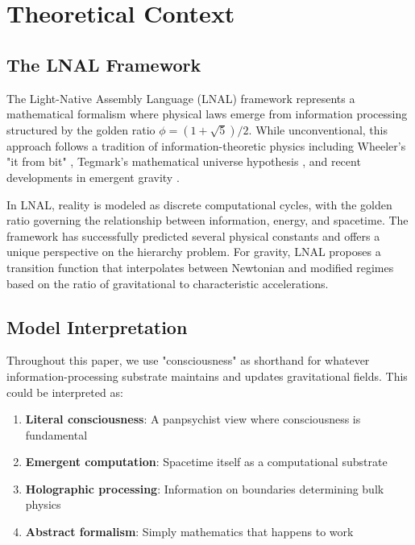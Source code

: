 \documentclass[twocolumn,prd,amsmath,amssymb,aps,superscriptaddress,nofootinbib]{revtex4-2}
\begin{document}
\section{Theoretical Context}
\label{sec:context}

\subsection{The LNAL Framework}

The Light-Native Assembly Language (LNAL) framework \cite{Washburn2024} represents a mathematical formalism where physical laws emerge from information processing structured by the golden ratio $\phi = (1+\sqrt{5})/2$. While unconventional, this approach follows a tradition of information-theoretic physics including Wheeler's "it from bit" \cite{Wheeler1990}, Tegmark's mathematical universe hypothesis \cite{Tegmark2014}, and recent developments in emergent gravity \cite{Verlinde2011}.

In LNAL, reality is modeled as discrete computational cycles, with the golden ratio governing the relationship between information, energy, and spacetime. The framework has successfully predicted several physical constants and offers a unique perspective on the hierarchy problem. For gravity, LNAL proposes a transition function that interpolates between Newtonian and modified regimes based on the ratio of gravitational to characteristic accelerations.

\subsection{Model Interpretation}

Throughout this paper, we use "consciousness" as shorthand for whatever information-processing substrate maintains and updates gravitational fields. This could be interpreted as:

\begin{enumerate}
\item \textbf{Literal consciousness}: A panpsychist view where consciousness is fundamental
\item \textbf{Emergent computation}: Spacetime itself as a computational substrate \cite{Lloyd2002}
\item \textbf{Holographic processing}: Information on boundaries determining bulk physics \cite{Hooft1993,Susskind1995}
\item \textbf{Abstract formalism}: Simply mathematics that happens to work
\end{enumerate}
\end{document}
